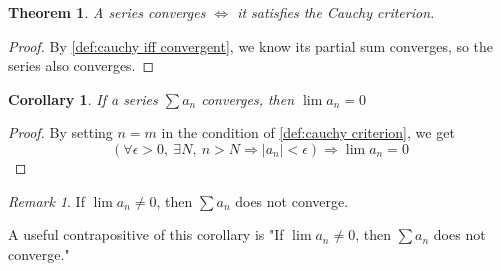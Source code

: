\documentclass[12pt, lettersize]{book}
\theoremstyle{plain}
\newtheorem{thm}{Theorem}[section]
\newtheorem{cor}{Corollary}[thm]
\theoremstyle{definition}
\theoremstyle{remark}
\newtheorem*{rem}{Remark}
\begin{document}
		\begin{thm}
		A series converges $\iff$ it satisfies the Cauchy criterion. 
		\end{thm}
		\begin{proof}
		By \ref{def:cauchy iff convergent}, we know its partial sum converges, so the series also converges.
		\end{proof}
		\begin{cor}\label{def:If a_n converges then lim(a_n)=0}
		If a series $\sum a_n$ converges, then $\lim a_n=0$
		\end{cor}
		\begin{proof}
		By setting $n=m$ in the condition of \ref{def:cauchy criterion}, we get
		\begin{displaymath}
			\left(\forall\epsilon>0,\ \exists N,\ n>N\Rightarrow\left|a_n\right|<\epsilon\right)\Rightarrow\lim a_n=0
		\end{displaymath}
		\end{proof}
		\begin{rem}
			If $\lim a_n\neq0$, then $\sum a_n$ does not converge.
		\end{rem}
		A useful contrapositive of this corollary is "If $\lim a_n\neq0$, then $\sum a_n$ does not converge."
		
\end{document}
